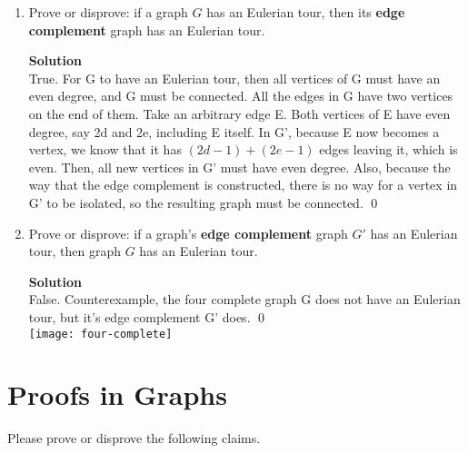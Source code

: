 \documentclass[11pt]{article}
\newcommand*{\Question}[1]{\section{#1}}
\newenvironment{Parts}{\begin{enumerate}[label=(\alph*)]}{\end{enumerate}}
\newcommand*{\Part}{\item}
\begin{document}
\begin{Parts}
\Part  Prove or disprove: if a graph $G$ has an Eulerian tour, then its \textbf{edge complement} graph has an Eulerian tour.

\begin{mdframed} \textbf{Solution} \\
True. For G to have an Eulerian tour, then all vertices of G must have an even degree, and G must be connected. All the edges in G have two vertices on the end of them. Take an arbitrary edge E. Both vertices of E have even degree, say 2d and 2e, including E itself. In G', because E now becomes a vertex, we know that it has $(2d-1)+(2e-1)$ edges leaving it, which is even. Then, all new vertices in G' must have even degree. Also, because the way that the edge complement is constructed, there is no way for a vertex in G' to be isolated, so the resulting graph must be connected. \qed
\end{mdframed}

\pagebreak  

\Part  Prove or disprove: if a graph's \textbf{edge complement} graph $G'$ has an Eulerian tour, then graph $G$ has an Eulerian tour.

\begin{mdframed} \textbf{Solution} \\
False. Counterexample, the four complete graph G does not have an Eulerian tour, but it's edge complement G' does. \qed\\
\texttt{[image: four-complete]}
\end{mdframed}

\end{Parts}
\pagebreak  

\Question{Proofs in Graphs} 

Please prove or disprove the following claims.
\end{document}
